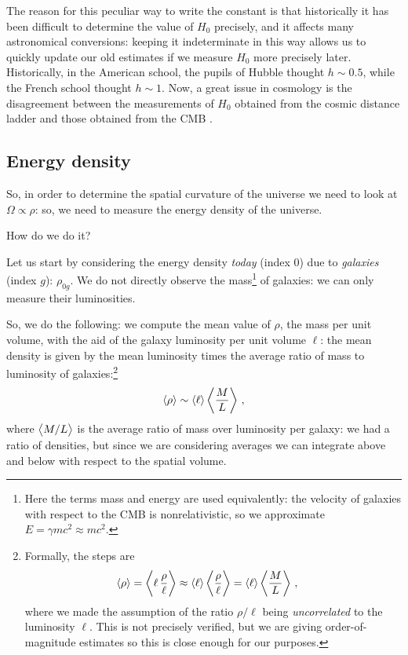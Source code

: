 \documentclass[main.tex]{subfiles}
\begin{document}
The reason for this peculiar way to write the constant is that historically it has been difficult to determine the value of \(H_0 \) precisely, and it affects many astronomical conversions: keeping it indeterminate in this way allows us to quickly update our old estimates if we measure \(H_0 \) more precisely later.
Historically, in the American school, the pupils of Hubble thought \(h \sim 0.5\), while the French school thought \(h \sim 1\).
Now, a great issue in cosmology is the disagreement between the measurements of \(H_0 \) obtained from the cosmic distance ladder and those obtained from the CMB \cite[]{Wong:2019}.

\subsection{Energy density}

So, in order to determine the spatial curvature of the universe we need to look at \(\Omega \propto \rho \): so, we need to measure the energy density of the universe.

How do we do it?

Let us start by considering the energy density \emph{today} (index 0) due to \emph{galaxies} (index \(g\)): \(\rho_{0g}\).
We do not directly observe the mass\footnote{Here the terms mass and energy are used equivalently: the velocity of galaxies with respect to the CMB is nonrelativistic, so we approximate \(E = \gamma m c^2 \approx m c^2\).}  
of galaxies: we can only measure their luminosities.

So, we do the following: we compute the mean value of \(\rho \), the mass per unit volume, with the aid of the galaxy luminosity per unit volume \(\ell\): the mean density is given by the mean luminosity times the average ratio of mass to luminosity of galaxies:\footnote{Formally, the steps are %
\begin{align}
\expval{\rho }
&= \expval{\ell \,\frac{\rho }{\ell}} 
\approx \expval{\ell} \expval{\frac{\rho }{\ell}} 
= \expval{\ell} \expval{\frac{M}{L}}
\,,
\end{align}
%
where we made the assumption of the ratio \(\rho / \ell\) being \emph{uncorrelated} to the luminosity \(\ell\). 
This is not precisely verified, but we are giving order-of-magnitude estimates so this is close enough for our purposes.}
%
\begin{align}
\expval{\rho }
\sim \expval{\ell} \expval{\frac{M}{L}}
\,,
\end{align}
%
where \(\expval{M  / L}\) is the average ratio of mass over luminosity per galaxy: we had a ratio of densities, but since we are considering averages we can integrate above and below with respect to the spatial volume.
\end{document}
